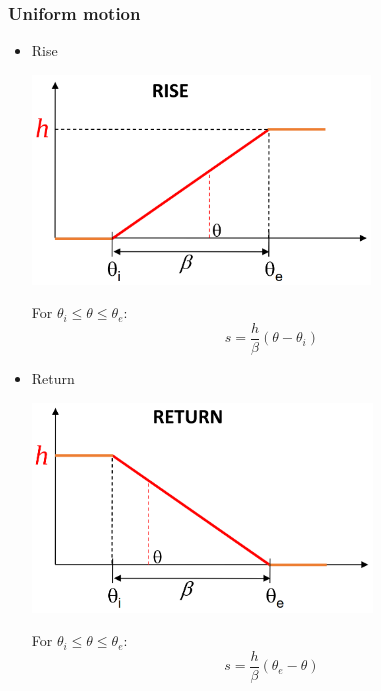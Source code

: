 \documentclass[11pt]{article}
\begin{document}
\subsubsection{Uniform motion}
\label{sec:orgb70750d}
\begin{itemize}
\item Rise
\begin{center}
\includegraphics[height=15em]{./images/formula-method-uniform-motion-rise-graph.png}
\end{center}

For \(\theta_i \le \theta \le \theta_e\):
\[s = \frac{h}{\beta} (\theta - \theta_i)\]

\item Return
\begin{center}
\includegraphics[height=15em]{./images/formula-method-uniform-motion-return-graph.png}
\end{center}

For \(\theta_i \le \theta \le \theta_e\):
\[s = \frac{h}{\beta} (\theta_e - \theta)\]
\end{itemize}
\end{document}
